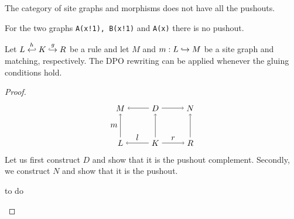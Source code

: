 The category of site graphs and morphisms does not have all the pushouts. %

\begin{example}
  For the two graphs \verb|A(x!1), B(x!1)| and \verb|A(x)| there is no pushout.
\end{example}

\begin{lemma}
  Let $L\overset{h}{\hookleftarrow} K \overset{g}{\hookrightarrow} R$ be a rule and let $M$ and $m:L\hookrightarrow M$ be a site graph and matching, respectively. The DPO rewriting can be applied whenever the gluing conditions hold.
\end{lemma}
\begin{proof}
  \[
  \begin{tikzpicture} %
    \node (l) at (-1.5,0) {\(L\)};
    \node (d) at (0,0) {\(K\)};
    \node (r) at (1.5,0) {\(R\)};
    \node (m) at (-1.5,1.5) {\(M\)};
    \node (d') at (0,1.5) {\(D\)};
    \node (n) at (1.5,1.5) {\(N\)};
    \draw [->] (d) -- node [above,midway] {\(l\)} (l);
    \draw [->] (d) -- node [above,midway] {\(r\)} (r);
    \draw [->] (d') -- (m);
    \draw [->] (d') -- (n);
    \draw [->] (l) -- node [left,midway] {\(m\)}  (m);
    \draw [->] (d) -- (d');
    \draw [->] (r) -- (n);
  \end{tikzpicture}
  \]
  Let us first construct $D$ and show that it is the pushout complement. Secondly, we construct $N$ and show that it is the pushout.
  \begin{mdframed}[backgroundcolor=blue!20]
    to do
  \end{mdframed}
\end{proof}


